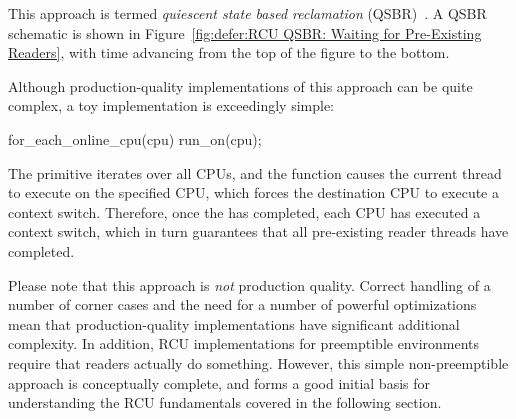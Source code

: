 This approach is termed \emph{quiescent state based reclamation}
(QSBR)~\cite{ThomasEHart2006a}.
A QSBR schematic is shown in
Figure~\ref{fig:defer:RCU QSBR: Waiting for Pre-Existing Readers},
with time advancing from the top of the figure to the bottom.

Although production-quality implementations of this approach can be
quite complex, a toy implementation is exceedingly simple:

\begin{VerbatimN}
for_each_online_cpu(cpu)
	run_on(cpu);
\end{VerbatimN}

The  primitive iterates over all CPUs, and
the  function causes the current thread to execute on the
specified CPU, which forces the destination CPU to execute a context
switch.
Therefore, once the  has completed, each CPU
has executed a context switch, which in turn guarantees that
all pre-existing reader threads have completed.

Please note that this approach is \emph{not} production quality.
Correct handling of a number of corner cases and the need for a number
of powerful optimizations mean that production-quality implementations
have significant additional complexity.
In addition, RCU implementations for preemptible environments
require that readers actually do something.
However, this simple non-preemptible approach is conceptually complete,
and forms a good initial basis for understanding the RCU fundamentals
covered in the following section.
